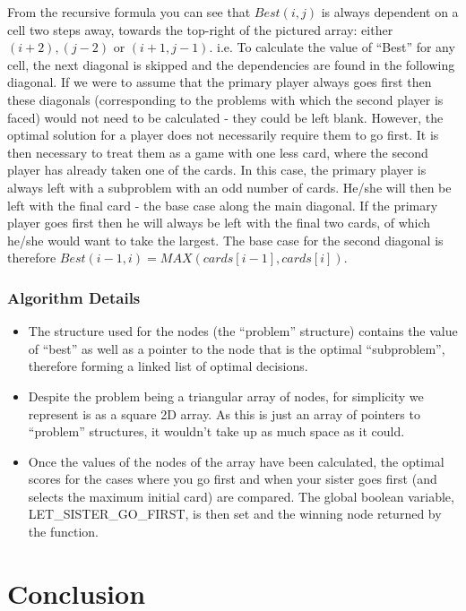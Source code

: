 \documentclass[11pt]{article}
\begin{document}
From the recursive formula you can see that $Best(i, j)$ is always dependent on a cell two steps away, towards the top-right of the pictured
array: either $(i+2), (j-2)$ or $(i+1, j-1)$. i.e. To calculate the value of ``Best'' for any cell, the next diagonal is skipped and the 
dependencies are found in the following diagonal. If we were to assume that the primary player always goes first then these diagonals 
(corresponding to the problems with which the second player is faced) would not need to be calculated - 
they could be left blank. However, the optimal solution for a player does not necessarily require them to go first. It is 
then necessary to treat them as a game with one less card, where the second player has already taken one of the cards. 
In this case, the primary player is always left with a subproblem with an odd number of cards. He/she will then 
be left with the final card - the base case along the main diagonal. If the primary player goes first then he will always 
be left with the final two cards, of which he/she would want to take the largest. The base case for the 
second diagonal is therefore $Best(i-1, i) = MAX(cards[i-1], cards[i])$.

\subsubsection*{Algorithm Details}
\begin{itemize}
		\item The structure used for the nodes (the ``problem'' structure) contains the value of ``best'' as well as a pointer to the node that is the optimal ``subproblem'', therefore forming a linked list of optimal decisions.
		\item Despite the problem being a triangular array of nodes, for simplicity we represent is as a square 2D array. As this is just an array of pointers to ``problem'' structures, it wouldn't take up as much space as it could.
		\item Once the values of the nodes of the array have been calculated, the optimal scores for the cases where you go 
			first and when your sister goes first (and selects the maximum initial card) are compared. The global boolean variable, 	
			LET\_SISTER\_GO\_FIRST, is then set and the winning node returned by the function.
\end{itemize}


\section{Conclusion}





\end{document}
